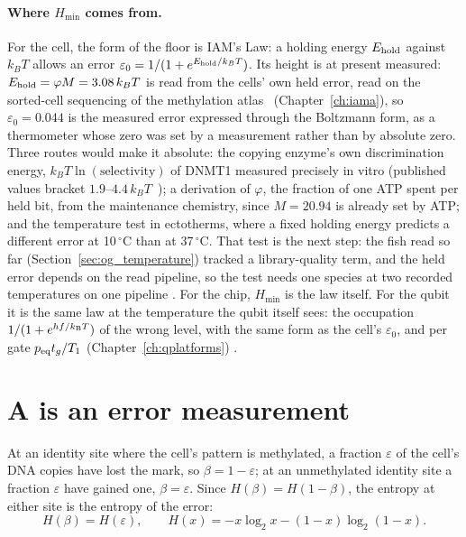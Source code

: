 \paragraph{Where $H_{\min}$ comes from.} For the cell, the form of the floor is IAM's Law: a holding energy $E_{\rm hold}$ against $k_BT$ allows
an error $\varepsilon_0=1/(1+e^{E_{\rm hold}/k_BT})$. Its height is at present measured: $E_{\rm hold}=\varphi M=3.08\,k_BT$ is read from the cells' own
held error, read on the sorted-cell sequencing of the methylation atlas~\cite{Loyfer2023} (Chapter~\ref{ch:iama}), so $\varepsilon_0=0.044$ is the measured error expressed through the Boltzmann form, as a thermometer whose zero was set by a measurement
rather than by absolute zero. Three routes would make it absolute: the copying enzyme's own discrimination energy, $k_BT\ln(\text{selectivity})$ of
DNMT1 measured precisely in vitro (published values bracket $1.9$--$4.4\,k_BT$~\cite{Pradhan1999,Goyal2006,Adam2023}); a derivation of $\varphi$, the fraction of one ATP spent per held bit,
from the maintenance chemistry, since $M=20.94$ is already set by ATP; and the temperature test in ectotherms, where a fixed holding energy predicts a
different error at 10\,$^\circ$C than at 37\,$^\circ$C. That test is the next step: the fish read so far (Section~\ref{sec:og_temperature})
tracked a library-quality term, and the held error depends on the read pipeline, so the test needs one species at two recorded temperatures on one
pipeline \openprob. For the
chip, $H_{\min}$ is the law itself. For the qubit it is the same law at the temperature the qubit itself sees: the occupation
$1/(1+e^{hf/k_{\mathrm B} T})$ of the wrong level, with the same form as the cell's $\varepsilon_0$, and per gate $p_{\rm eq}t_g/T_1$
(Chapter~\ref{ch:qplatforms}) \derived.

\section{A is an error measurement}
At an identity site where the cell's pattern is methylated, a fraction $\varepsilon$ of the cell's DNA copies have lost the mark, so
$\beta=1-\varepsilon$; at an unmethylated identity site a fraction $\varepsilon$ have gained one, $\beta=\varepsilon$. Since
$H(\beta)=H(1-\beta)$, the entropy at either site is the entropy of the error:
\begin{equation}H(\beta)=H(\varepsilon),\qquad H(x)=-x\log_2x-(1-x)\log_2(1-x).\end{equation}
\derived
